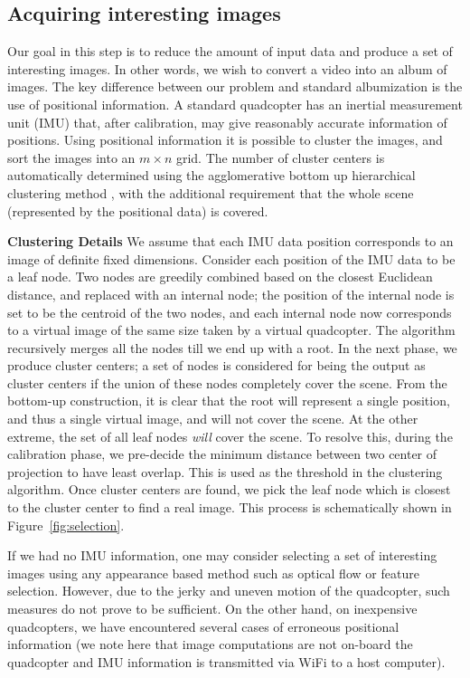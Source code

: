 \subsection{Acquiring interesting images}
\label{sec:selection}
Our goal in this step is to reduce the amount of input data and
produce a set of interesting images.  In other words, we wish to
convert a video into an album of images.  The key difference between
our problem and standard albumization \cite{Aner, Lee} is the use of
positional information.  A standard quadcopter has an inertial
measurement unit (IMU) that, after calibration, may give reasonably
accurate information of positions. Using positional information it is
possible to cluster the images, and sort the images into an $m\times
n$ grid.  The number of cluster centers is automatically determined
using the agglomerative bottom up hierarchical clustering method
\cite{Lior}, with the additional requirement that the whole scene
(represented by the positional data) is covered.

{\bf Clustering Details} We assume that each IMU data position
corresponds to an image of definite fixed dimensions.  Consider each
position of the IMU data to be a leaf node. Two nodes are greedily
combined based on the closest Euclidean distance, and replaced with an
internal node; the position of the internal node is set to be the
centroid of the two nodes, and each internal node now corresponds to a
virtual image of the same size taken by a virtual quadcopter.  The
algorithm recursively merges all the nodes till we end up with a root.
In the next phase, we produce cluster centers; a set of nodes is
considered for being the output as cluster centers if the union of
these nodes completely cover the scene. From the bottom-up
construction, it is clear that the root will represent a single
position, and thus a single virtual image, and will not cover the
scene.  At the other extreme, the set of all leaf nodes \emph{will}
cover the scene. To resolve this, during the calibration phase, we
pre-decide the minimum distance between two center of projection to
have least overlap. This is used as the threshold in the clustering
algorithm.  Once cluster centers are found, we pick the leaf node
which is closest to the cluster center to find a real image. This
process is schematically shown in Figure~\ref{fig:selection}.

If we had no IMU information, one may consider selecting a
set of interesting images using any appearance based method such as
optical flow or feature selection.  However, due to the jerky and
uneven motion of the quadcopter, such measures do not prove to be
sufficient. On the other hand, on inexpensive quadcopters, we have
encountered several cases of erroneous positional information (we note
here that image computations are not on-board the quadcopter and IMU
information is transmitted via WiFi to a host computer).  

